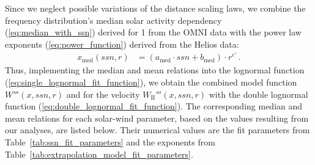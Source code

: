 \documentclass[]{aa}
\begin{document}
        Since we neglect possible variations of the distance scaling laws, we combine the frequency distribution’s median solar activity dependency (\ref{eq:median_with_ssn}) derived for \SI{1}{\au} from the OMNI data with the power law exponents (\ref{eq:power_function}) derived from the Helios data:
        \begin{align}
                x_\text{med}(ssn,r) &= \left(a_\text{med} \cdot ssn + b_\text{med}\right) \cdot r^{e'}    \,.     \label{eq:general_sw_model}
        \end{align}
        Thus, implementing the median and mean relations into the lognormal function (\ref{eq:single_lognormal_fit_function}), we obtain the combined model function $W'''(x,ssn,r)$ and for the velocity $W_\text{II}'''(x,ssn,r)$ with the double lognormal function (\ref{eq:double_lognormal_fit_function}). The corresponding median and mean relations for each solar-wind parameter, based on the values resulting from our analyses, are listed below. Their numerical values are the fit parameters from Table~\ref{tab:ssn_fit_parameters} and the exponents from Table~\ref{tab:extrapolation_model_fit_parameters}.
\end{document}
